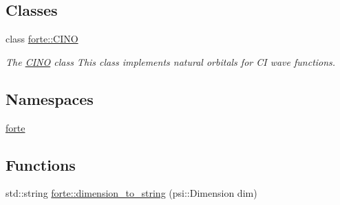 \subsection*{Classes}
\begin{DoxyCompactItemize}
\item 
class \mbox{\hyperlink{classforte_1_1_c_i_n_o}{forte\+::\+C\+I\+NO}}
\begin{DoxyCompactList}\small\item\em The \mbox{\hyperlink{classforte_1_1_c_i_n_o}{C\+I\+NO}} class This class implements natural orbitals for CI wave functions. \end{DoxyCompactList}\end{DoxyCompactItemize}
\subsection*{Namespaces}
\begin{DoxyCompactItemize}
\item 
 \mbox{\hyperlink{namespaceforte}{forte}}
\end{DoxyCompactItemize}
\subsection*{Functions}
\begin{DoxyCompactItemize}
\item 
std\+::string \mbox{\hyperlink{namespaceforte_a65b11bc0db5d6e54f6853083b8b5ba75}{forte\+::dimension\+\_\+to\+\_\+string}} (psi\+::\+Dimension dim)
\end{DoxyCompactItemize}
